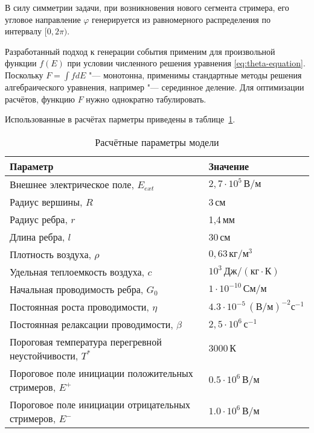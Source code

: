 В силу симметрии задачи, при возникновения нового сегмента стримера, его угловое направление $\varphi$ генерируется из равномерного распределения по интервалу $[0, 2\pi)$.

Разработанный подход к генерации события применим для произвольной функции $f(E)$ при условии численного решения уравнения \eqref{eq:theta-equation}. Поскольку $F = \int f dE$ "--- монотонна, применимы стандартные методы решения алгебраического уравнения, например "--- серединное деление. Для оптимизации расчётов, функцию $F$ нужно однократно табулировать.

Использованные в расчётах парметры приведены в таблице~\ref{tab:parameters}.
\begin{table}[h]
	\caption{Расчётные параметры модели}
	\label{tab:parameters}
	\begin{center}
		\begin{tabular}{l|l}
			Параметр & Значение \\
			\hline
			Внешнее электрическое поле, $E_{ext}$ & $2,7\cdot 10^{5}\,\text{В}/\text{м}$ \\
			Радиус вершины, $R$ & 3\,см \\
			Радиус ребра, $r$ & 1,4\,мм \\
			Длина ребра, $l$ & 30\,см \\
			Плотность воздуха, $\rho$ & $0,63\,\text{кг}/\text{м}^3$ \\
			Удельная теплоемкость воздуха, $c$ & $10^3\,\text{Дж}/(\text{кг}\cdot\text{К})$ \\
			Начальная проводимость ребра, $G_0$ & $1\cdot10^{-10}\,\text{См}/\text{м}$ \\
			Постоянная роста проводимости, $\eta$ & $4.3\cdot10^{-5}\,(\text{В}/\text{м})^{-2}\text{с}^{-1}$ \\
			Постоянная релаксации проводимости, $\beta$ & $2,5\cdot10^6\,\text{с}^{-1}$ \\
			Пороговая температура перегревной неустойчивости, $T^*$ & $3000\,\text{К}$ \\
			Пороговое поле инициации положительных стримеров, $E^+$ & $0.5\cdot 10^{6}\,\text{В}/\text{м}$\\
			Пороговое поле инициации отрицательных стримеров, $E^-$ & $1.0\cdot 10^{6}\,\text{В}/\text{м}$\\
		\end{tabular}
	\end{center}
\end{table}

